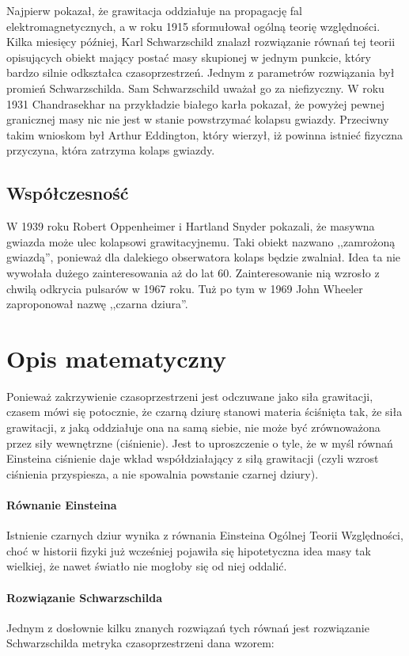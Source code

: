 \documentclass[12pt]{article}
\begin{document}
Najpierw pokaza\l{}, \.{z}e grawitacja oddzia\l{}uje na propagacj\k{e} fal elektromagnetycznych, a w roku 1915 sformu\l{}owa\l{} og\'{o}ln\k{a} teori\k{e} wzgl\k{e}dno\'{s}ci. Kilka miesi\k{e}cy p\'{o}\'{z}niej, Karl Schwarzschild znalaz\l{} rozwi\k{a}zanie r\'{o}wna\'{n} tej teorii opisuj\k{a}cych obiekt maj\k{a}cy posta\'{c} masy skupionej w jednym punkcie, kt\'{o}ry bardzo silnie odkszta\l{}ca czasoprzestrze\'{n}. Jednym z parametr\'{o}w rozwi\k{a}zania by\l{} promie\'{n} Schwarzschilda. Sam Schwarzschild uwa\.{z}a\l{} go za niefizyczny. W roku 1931 Chandrasekhar na przyk\l{}adzie bia\l{}ego kar\l{}a pokaza\l{}, \.{z}e powy\.{z}ej pewnej granicznej masy nic nie jest w stanie powstrzyma\'{c} kolapsu gwiazdy. Przeciwny takim wnioskom by\l{} Arthur Eddington, kt\'{o}ry wierzy\l{}, i\.{z} powinna istnie\'{c} fizyczna przyczyna, kt\'{o}ra zatrzyma kolaps gwiazdy.
\subsection{Wsp\'{o}\l{}czesno\'{s}\'{c}}
W 1939 roku Robert Oppenheimer i Hartland Snyder pokazali, \.{z}e masywna gwiazda mo\.{z}e ulec kolapsowi grawitacyjnemu. Taki obiekt nazwano ,,zamro\.{z}on\k{a} gwiazd\k{a}\textquotedblright{}, poniewa\.{z} dla dalekiego obserwatora kolaps b\k{e}dzie zwalnia\l{}. Idea ta nie wywo\l{}a\l{}a du\.{z}ego zainteresowania a\.{z} do lat 60. Zainteresowanie ni\k{a} wzros\l{}o z chwil\k{a} odkrycia pulsar\'{o}w w 1967 roku. Tu\.{z} po tym w 1969 John Wheeler zaproponowa\l{} nazw\k{e} ,,czarna dziura\textquotedblright{}.
\newpage
\section{Opis matematyczny}
Poniewa\.{z} zakrzywienie czasoprzestrzeni jest odczuwane jako si\l{}a grawitacji, czasem m\'{o}wi si\k{e} potocznie, \.{z}e czarn\k{a} dziur\k{e} stanowi materia \'{s}ci\'{s}ni\k{e}ta tak, \.{z}e si\l{}a grawitacji, z jak\k{a} oddzia\l{}uje ona na sam\k{a} siebie, nie mo\.{z}e by\'{c} zr\'{o}wnowa\.{z}ona przez si\l{}y wewn\k{e}trzne (ci\'{s}nienie). Jest to uproszczenie o tyle, \.{z}e w my\'{s}l r\'{o}wna\'{n} Einsteina ci\'{s}nienie daje wk\l{}ad wsp\'{o}\l{}dzia\l{}aj\k{a}cy z si\l{}\k{a} grawitacji (czyli wzrost ci\'{s}nienia przyspiesza, a nie spowalnia powstanie czarnej dziury).
\paragraph{R\'{o}wnanie Einsteina}
Istnienie czarnych dziur wynika z r\'{o}wnania Einsteina Og\'{o}lnej Teorii Wzgl\k{e}dno\'{s}ci, cho\'{c} w historii fizyki ju\.{z} wcze\'{s}niej pojawi\l{}a si\k{e} hipotetyczna idea masy tak wielkiej, \.{z}e nawet \'{s}wiat\l{}o nie mog\l{}oby si\k{e} od niej oddali\'{c}.
\paragraph{Rozwi\k{a}zanie Schwarzschilda}
Jednym z dos\l{}ownie kilku znanych rozwi\k{a}za\'{n} tych r\'{o}wna\'{n} jest rozwi\k{a}zanie Schwarzschilda \textendash{} metryka czasoprzestrzeni dana wzorem:

 
 
 
\end{document}
